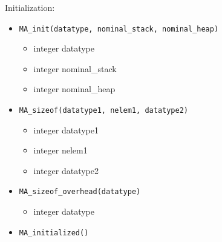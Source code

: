 Initialization: 
\begin{itemize}
\item {\tt MA\_init(datatype, nominal\_stack, nominal\_heap)}
\begin{itemize}
\item      integer datatype
\item      integer nominal\_stack
\item      integer nominal\_heap
\end{itemize}

\item {\tt MA\_sizeof(datatype1, nelem1, datatype2)}
\begin{itemize}
\item      integer datatype1
\item      integer nelem1
\item      integer datatype2
\end{itemize}

\item {\tt MA\_sizeof\_overhead(datatype)}
\begin{itemize}
\item      integer datatype
\end{itemize}

\item {\tt MA\_initialized()}

\end{itemize}

